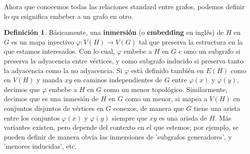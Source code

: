 \documentclass[12pt]{report}
\theoremstyle{plain}
\theoremstyle{definition}
\newtheorem{definition}[theorem]{Definición}
\begin{document}


Ahora que conocemos todas las relaciones standard entre grafos, podemos definir lo qu esignifica embeber a un grafo en otro.

\begin{definition}
Básicamente, una \textbf{inmersión} (o \textbf{embedding} en inglés) de $H$ en $G$ es un mapa inyectivo $\varphi : V(H) \rightarrow V(G)$ tal que preserva la estructura en la que estamos interesados. Con lo cual, $\varphi$ embebe a $H$ en $G$ c omo un subgrafo si preserva la adyacencia entre vértices, y como subgrafo inducido si preserva tanto la adyacencia como la no adyacencia. Si $\varphi$ está definido también en $E(H)$ como en $V(H)$ y manda $xy$ en caminos independientes de $G$ entre $\varphi (x)$ y $\varphi (y)$, decimos que $\varphi$ embebe a $H$ en $G$ como un menor topológico. Similarmente, decimos que es una inmesión de $H$ en $G$ como un menor, si mapea a $V(H)$ en conjuntos disjuntos de vértices en $G$ conexos, de manera que $G$ tiene una arista entre los conjuntos $\varphi (x)$ y $\varphi (y)$ siempre que $xy$ es una arisda de $H$. Más varíantes existen, pero depende del contexto en el que estemos; por ejemplo, se pueden definir de manera obvia las inmersiones de 'subgrafos generadores', y 'menores inducidas', etc.
\end{definition}


\end{document}
